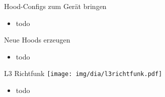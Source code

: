 \begin{frame}{Hood-Configs zum Gerät bringen}
    \begin{itemize}
        \item todo
    \end{itemize}
\end{frame}

\begin{frame}{Neue Hoods erzeugen}
    \begin{itemize}
        \item todo
    \end{itemize}
\end{frame}

\begin{frame}{L3 Richtfunk}
    \texttt{[image: img/dia/l3richtfunk.pdf]}
    \begin{itemize}
        \item todo
    \end{itemize}
\end{frame}


